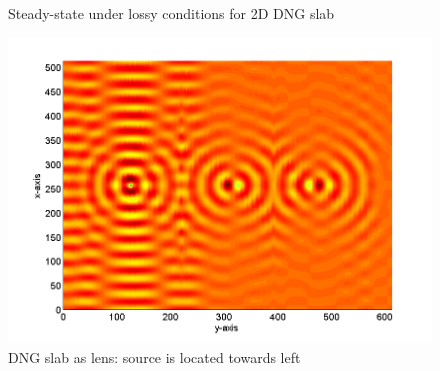 \begin{figure}[H]
\centering
{}
\caption{Steady-state under lossy conditions for 2D DNG slab}
\label{fig:2DDNG-SteadyState-Lossy}
\end{figure}
\begin{figure}[H]
\centering
\includegraphics[scale=0.5, trim=1.0cm 0.05cm 1.75cm 0cm, clip]{Figures/FigCh03_2DDNGSlabLens.png}
\caption{DNG slab as lens: source is located towards left}
\label{fig:2DDNG-Slab-lens}
\end{figure}
